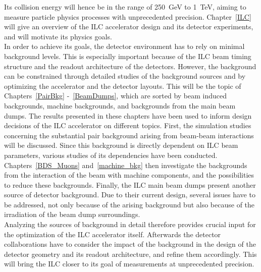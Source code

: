 Its collision energy will hence be in the range of \SI{250}{\GeV} to \SI{1}{\TeV}, aiming to measure particle physics processes with unprecedented precision.
Chapter~\ref{ILC} will give an overview of the ILC accelerator design and its detector experiments, and will motivate its physics goals.
\\In order to achieve its goals, the detector environment has to rely on minimal background levels.
This is especially important because of the ILC beam timing structure and the readout architecture of the detectors.
However, the background can be constrained through detailed studies of the background sources and by optimizing the accelerator and the detector layouts.
This will be the topic of Chapters~\ref{PairBkg} -~\ref{BeamDumps}, which are sorted by beam induced backgrounds, machine backgrounds, and backgrounds from the main beam dumps.
The results presented in these chapters have been used to inform design decisions of the ILC accelerator on different topics.
First, the simulation studies concerning the substantial \positron\electron pair background arising from beam-beam interactions will be discussed.
Since this background is directly dependent on ILC beam parameters, various studies of its dependencies have been conducted.
Chapters~\ref{BDS_Muons} and~\ref{machine_bkg} then investigate the backgrounds from the interaction of the beam with machine components, and the possibilities to reduce these backgrounds.
Finally, the ILC main beam dumps present another source of detector background.
Due to their current design, several issues have to be addressed, not only because of the arising background but also because of the irradiation of the beam dump surroundings.
\\Analyzing the sources of background in detail therefore provides crucial input for the optimization of the ILC accelerator itself.
Afterwards the detector collaborations have to consider the impact of the background in the design of the detector geometry and its readout architecture, and refine them accordingly.
This will bring the ILC closer to its goal of measurements at unprecedented precision.
